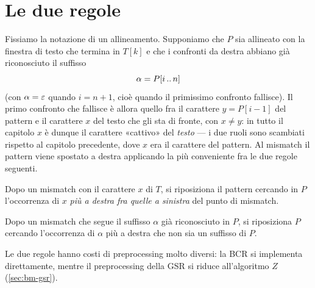 \section{Le due regole}\label{sec:bm-regole}

Fissiamo la notazione di un allineamento. Supponiamo che $P$ sia allineato con la
finestra di testo che termina in $T[k]$ e che i confronti da destra abbiano già
riconosciuto il suffisso
\[
  \alpha=P[i\,..\,n]
\]
(con $\alpha=\varepsilon$ quando $i=n+1$, cioè quando il primissimo confronto fallisce).
Il primo confronto che fallisce è allora quello fra il carattere $y=P[i-1]$ del
pattern e il carattere $x$ del testo che gli sta di fronte, con $x\neq y$: in tutto
il capitolo $x$ è dunque il carattere «cattivo» del \emph{testo} --- i due ruoli
sono scambiati rispetto al capitolo precedente, dove $x$ era il carattere del
pattern. Al mismatch il pattern viene spostato a destra applicando la più
conveniente fra le due regole seguenti.

\begin{definizione}\label{def:bcr}
Dopo un mismatch con il carattere $x$ di $T$, si riposiziona il pattern cercando in
$P$ l'occorrenza di $x$ \emph{più a destra fra quelle a sinistra} del punto di
mismatch.
\end{definizione}

\begin{definizione}\label{def:gsr}
Dopo un mismatch che segue il suffisso $\alpha$ già riconosciuto in $P$, si
riposiziona $P$ cercando l'occorrenza di $\alpha$ più a destra che non sia un
suffisso di $P$.
\end{definizione}

Le due regole hanno costi di preprocessing molto diversi: la BCR si implementa
direttamente, mentre il preprocessing della GSR si riduce all'algoritmo $Z$
(\autoref{sec:bm-gsr}).


